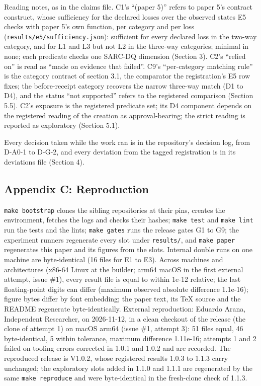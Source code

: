 \documentclass[
  10pt,
]{article}
\begin{document}
Reading notes, as in the claims file. C1's ``(paper 5)'' refers to paper
5's contract construct, whose sufficiency for the declared losses over
the observed states E5 checks with paper 5's own function, per category
and per loss (\texttt{results/e5/sufficiency.json}): sufficient for
every declared loss in the two-way category, and for L1 and L3 but not
L2 in the three-way categories; minimal in none; each predicate checks
one SARC-DQ dimension (Section 3). C2's ``relied on'' is read as ``made
on evidence that failed''. C9's ``per-category matching rule'' is the
category contract of section 3.1, the comparator the registration's E5
row fixes; the before-receipt category recovers the narrow three-way
match (D1 to D4), and the status ``not supported'' refers to the
registered comparison (Section 5.5). C2's exposure is the registered
predicate set; its D4 component depends on the registered reading of the
creation as approval-bearing; the strict reading is reported as
exploratory (Section 5.1).

Every decision taken while the work ran is in the repository's decision
log, from D-A0-1 to D-G-2, and every deviation from the tagged
registration is in its deviations file (Section 4).

\hypertarget{appendix-c-reproduction}{%
\subsection{Appendix C: Reproduction}\label{appendix-c-reproduction}}

\texttt{make\ bootstrap} clones the sibling repositories at their pins,
creates the environment, fetches the logs and checks their hashes;
\texttt{make\ test} and \texttt{make\ lint} run the tests and the lints;
\texttt{make\ gates} runs the release gates G1 to G9; the experiment
runners regenerate every slot under \texttt{results/}, and
\texttt{make\ paper} regenerates this paper and its figures from the
slots. Internal double runs on one machine are byte-identical (16 files
for E1 to E3). Across machines and architectures (x86-64 Linux at the
builder; arm64 macOS in the first external attempt, issue \#1), every
result file is equal to within 1e-12 relative; the last floating-point
digits can differ (maximum observed absolute difference 1.1e-16); figure
bytes differ by font embedding; the paper text, its TeX source and the
README regenerate byte-identically. External reproduction: Eduardo
Arana, Independent Researcher, on 2026-11-12, in a clean checkout of the
release (the clone of attempt 1) on macOS arm64 (issue \#1, attempt 3):
51 files equal, 46 byte-identical, 5 within tolerance, maximum
difference 1.11e-16; attempts 1 and 2 failed on tooling errors corrected
in 1.0.1 and 1.0.2 and are recorded. The reproduced release is V1.0.2,
whose registered results 1.0.3 to 1.1.3 carry unchanged; the exploratory
slots added in 1.1.0 and 1.1.1 are regenerated by the same
\texttt{make\ reproduce} and were byte-identical in the fresh-clone
check of 1.1.3.
\end{document}
